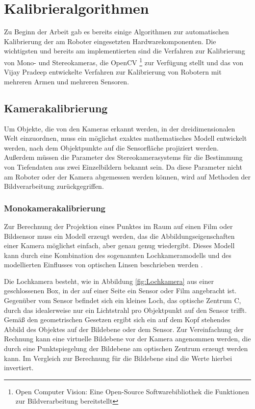 
\section{Kalibrieralgorithmen} %

\label{sub:Kalibrieralgorithmen}


Zu
Beginn der Arbeit gab es bereits einige Algorithmen zur automatischen
Kalibrierung der am Roboter eingesetzten Hardwarekomponenten. Die wichtigsten
und bereits am \cob implementierten sind die Verfahren zur Kalibrierung von
Mono- und Stereokameras, die OpenCV \footnote{Open Computer Vision: Eine 
Open-Source Softwarebibliothek die Funktionen zur Bildverarbeitung bereitstellt}
zur Verfügung stellt und das von Vijay
Pradeep entwickelte Verfahren zur Kalibrierung von Robotern mit mehreren Armen
und mehreren Sensoren.\cite{Pradeep2010}


\subsection{Kamerakalibrierung} %

\label{sub:Kamerakalibrierung}


Um
Objekte, die von den Kameras erkannt werden, in der dreidimensionalen Welt
einzuordnen, muss ein möglichst exaktes mathematisches Modell entwickelt werden,
nach dem Objektpunkte auf die Sensorfläche projiziert werden. Außerdem müssen
die Parameter des Stereokamerasystems für die Bestimmung von Tiefendaten aus
zwei Einzelbildern bekannt sein. Da diese Parameter nicht am
Roboter oder der Kamera abgemessen werden können, wird auf Methoden der
Bildverarbeitung zurückgegriffen.

\subsubsection{Monokamerakalibrierung} %

\label{ssub:Monokamera}


Zur Berechnung der Projektion eines Punktes im Raum auf einen Film oder
Bildsensor muss ein Modell erzeugt werden, das die Abbildungseigenschaften
einer Kamera möglichst einfach, aber genau genug wiedergibt. Dieses Modell kann
durch eine Kombination des sogenannten Lochkameramodells und des modellierten
Einflusses von optischen Linsen beschrieben werden \cite{Bradski2008}.

Die Lochkamera besteht, wie in Abbildung \ref{fig:Lochkamera} aus einer 
geschlossenen Box, in der auf einer Seite ein
Sensor oder Film angebracht ist. Gegenüber vom Sensor befindet sich ein kleines
Loch, das optische Zentrum C, durch das idealerweise nur ein Lichtstrahl pro
Objektpunkt auf den Sensor
trifft. Gemäß den geometrischen Gesetzen ergibt sich ein auf dem Kopf stehendes
Abbild des Objektes auf der Bildebene oder dem Sensor. Zur Vereinfachung der
Rechnung kann eine virtuelle Bildebene vor der Kamera angenommen werden, die
durch eine Punktspiegelung der Bildebene am optischen Zentrum erzeugt werden
kann. Im Vergleich zur Berechnung für die Bildebene sind die Werte hierbei
invertiert\cite{forsyth2011}.


